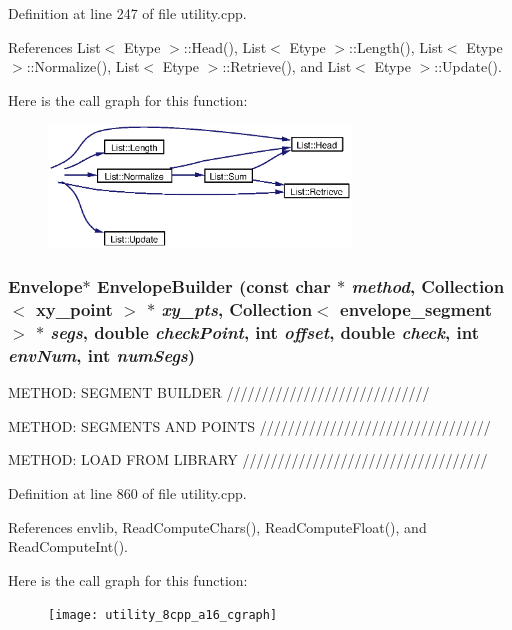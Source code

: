 Definition at line 247 of file utility.cpp.

References List$<$ Etype $>$::Head(), List$<$ Etype $>$::Length(), List$<$ Etype $>$::Normalize(), List$<$ Etype $>$::Retrieve(), and List$<$ Etype $>$::Update().

Here is the call graph for this function:\begin{figure}[H]
\begin{center}
\leavevmode
\includegraphics[width=228pt]{utility_8cpp_a8_cgraph}
\end{center}
\end{figure}
\subsubsection{\setlength{\rightskip}{0pt plus 5cm}Envelope$\ast$ Envelope\-Builder (const char $\ast$ {\em method}, Collection$<$ xy\_\-point $>$ $\ast$ {\em xy\_\-pts}, Collection$<$ envelope\_\-segment $>$ $\ast$ {\em segs}, double {\em check\-Point}, int {\em offset}, double {\em check}, int {\em env\-Num}, int {\em num\-Segs})}\label{utility_8cpp_a16}


METHOD: SEGMENT BUILDER /////////////////////////////

METHOD: SEGMENTS AND POINTS /////////////////////////////////

METHOD: LOAD FROM LIBRARY /////////////////////////////////// 

Definition at line 860 of file utility.cpp.

References envlib, Read\-Compute\-Chars(), Read\-Compute\-Float(), and Read\-Compute\-Int().

Here is the call graph for this function:\begin{figure}[H]
\begin{center}
\leavevmode
\texttt{[image: utility\_8cpp\_a16\_cgraph]}
\end{center}
\end{figure}
